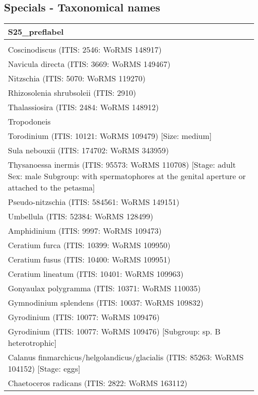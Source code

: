 \documentclass[
]{book}
\begin{document}
\hypertarget{specials---taxonomical-names}{%
\subsection{Specials - Taxonomical names}\label{specials---taxonomical-names}}

\begin{tabular}[t]{l}
\hline
S25\_preflabel\\
\hline
\\
\hline
Coscinodiscus (ITIS: 2546: WoRMS 148917)\\
\hline
Navicula directa (ITIS: 3669: WoRMS 149467)\\
\hline
Nitzschia (ITIS: 5070: WoRMS 119270)\\
\hline
Rhizosolenia shrubsoleii (ITIS: 2910)\\
\hline
Thalassiosira (ITIS: 2484: WoRMS 148912)\\
\hline
Tropodoneis\\
\hline
Torodinium (ITIS: 10121: WoRMS 109479) [Size: medium]\\
\hline
Sula nebouxii (ITIS: 174702: WoRMS 343959)\\
\hline
Thysanoessa inermis (ITIS: 95573: WoRMS 110708) [Stage: adult Sex: male Subgroup: with spermatophores at the genital aperture or attached to the petasma]\\
\hline
Pseudo-nitzschia (ITIS: 584561: WoRMS 149151)\\
\hline
Umbellula (ITIS: 52384: WoRMS 128499)\\
\hline
Amphidinium (ITIS: 9997: WoRMS 109473)\\
\hline
Ceratium furca (ITIS: 10399: WoRMS 109950)\\
\hline
Ceratium fusus (ITIS: 10400: WoRMS 109951)\\
\hline
Ceratium lineatum (ITIS: 10401: WoRMS 109963)\\
\hline
Gonyaulax polygramma (ITIS: 10371: WoRMS 110035)\\
\hline
Gymnodinium splendens (ITIS: 10037: WoRMS 109832)\\
\hline
Gyrodinium (ITIS: 10077: WoRMS 109476)\\
\hline
Gyrodinium (ITIS: 10077: WoRMS 109476) [Subgroup: sp. B heterotrophic]\\
\hline
Calanus finmarchicus/helgolandicus/glacialis (ITIS: 85263: WoRMS 104152) [Stage: eggs]\\
\hline
Chaetoceros radicans (ITIS: 2822: WoRMS 163112)\\
\hline

\end{tabular}
\end{document}
